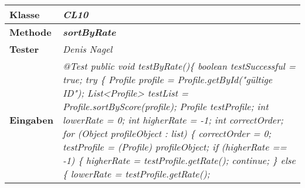 \begin{longtable}{|p{4cm}|p{11cm}|}
\hline
\textbf{Klasse} & \textit{\textbf{CL10}} \\
\hline
\textbf{Methode} & \textit{\textbf{sortByRate}} \\
\hline
\textbf{Tester} & \textit{Denis Nagel} \\
\hline
\textbf{Eingaben} & \textit{
@Test \newline
public void testByRate()\{ \newline
\hspace*{3mm}    boolean testSuccessful = true; \newline
\hspace*{3mm}    try \{ \newline
\hspace*{6mm}      	 Profile profile = Profile.getById("gültige ID"); \newline
\hspace*{6mm}        List<Profile> testList = Profile.sortByScore(profile); \newline
\hspace*{6mm}        Profile testProfile; \newline
\hspace*{6mm}        int lowerRate = 0; \newline
\hspace*{6mm}        int higherRate = -1; \newline
\hspace*{6mm}        int correctOrder; \newline
\hspace*{6mm}        for (Object profileObject : list) \{ \newline
\hspace*{9mm}            correctOrder = 0; \newline
\hspace*{9mm}            testProfile = (Profile) profileObject; \newline
\hspace*{9mm}            if (higherRate == -1) \{ \newline
\hspace*{12mm}                higherRate = testProfile.getRate(); \newline
\hspace*{12mm}                continue; \newline
\hspace*{9mm}            \} else \{ \newline
\hspace*{12mm}                lowerRate = testProfile.getRate(); \newline
}
\end{longtable}
